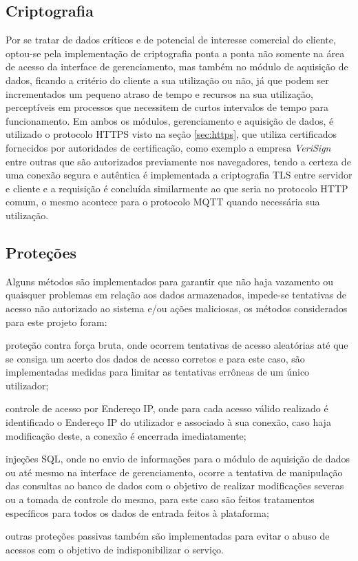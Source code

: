         \subsection{Criptografia}
        \label{sec:criptografia}
        Por se tratar de dados críticos e de potencial de interesse comercial do cliente, optou-se pela implementação de criptografia ponta a ponta não somente na área de acesso da interface de gerenciamento, mas também no módulo de aquisição de dados, ficando a critério do cliente a sua utilização ou não, já que podem ser incrementados um pequeno atraso de tempo e recursos na sua utilização, perceptíveis em processos que necessitem de curtos intervalos de tempo para funcionamento.  Em ambos os módulos, gerenciamento e aquisição de dados, é utilizado o protocolo \gls{HTTPS} visto na seção \ref{sec:https}, que utiliza certificados fornecidos por autoridades de certificação, como exemplo a empresa \textit{VeriSign} entre outras que são autorizados previamente nos navegadores, tendo a certeza de uma conexão segura e autêntica é implementada a criptografia \gls{TLS} entre servidor e cliente e a requisição é concluída similarmente ao que seria no protocolo \gls{HTTP} comum, o mesmo acontece para o protocolo \gls{MQTT} quando necessária sua utilização.
        
        \subsection{Proteções}
        \label{sec:protecoes}
        
        Alguns métodos são implementados para garantir que não haja vazamento ou quaisquer problemas em relação aos dados armazenados, impede-se tentativas de acesso não autorizado ao sistema e/ou ações maliciosas, os métodos considerados para este projeto foram:
        
        \begin{alineascomponto}
            \item proteção contra força bruta, onde ocorrem tentativas de acesso aleatórias até que se consiga um acerto dos dados de acesso corretos e para este caso, são implementadas medidas para limitar as tentativas errôneas de um único utilizador;
            \item controle de acesso por Endereço IP, onde para cada acesso válido realizado é identificado o Endereço IP do utilizador e associado à sua conexão, caso haja modificação deste, a conexão é encerrada imediatamente;
            \item injeções \gls{SQL}, onde no envio de informações para o módulo de aquisição de dados ou até mesmo na interface de gerenciamento, ocorre a tentativa de manipulação das consultas ao banco de dados com o objetivo de realizar modificações severas ou a tomada de controle do mesmo, para este caso são feitos tratamentos específicos para todos os dados de entrada feitos à plataforma;
            \item outras proteções passivas também são implementadas para evitar o abuso de acessos com o objetivo de indisponibilizar o serviço.
        \end{alineascomponto}

